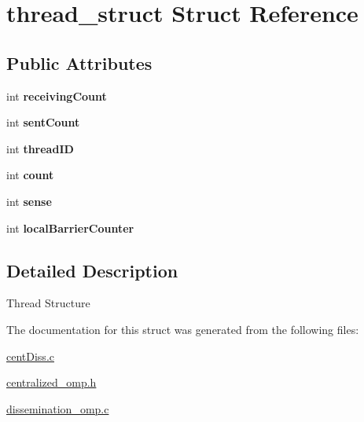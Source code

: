 \hypertarget{structthread__struct}{\section{thread\-\_\-struct \-Struct \-Reference}
\label{structthread__struct}
}
\subsection*{\-Public \-Attributes}
\begin{DoxyCompactItemize}
\item 
\hypertarget{structthread__struct_a4bb7beddb9c9e22e628bdc8fcc1b3571}{int {\bfseries receiving\-Count}}\label{structthread__struct_a4bb7beddb9c9e22e628bdc8fcc1b3571}

\item 
\hypertarget{structthread__struct_a911cf8c6043c7cd16c147370ffed3652}{int {\bfseries sent\-Count}}\label{structthread__struct_a911cf8c6043c7cd16c147370ffed3652}

\item 
\hypertarget{structthread__struct_a5af9a1ead75993e5fb7fdf6b17c2cb64}{int {\bfseries thread\-I\-D}}\label{structthread__struct_a5af9a1ead75993e5fb7fdf6b17c2cb64}

\item 
\hypertarget{structthread__struct_aca0f6c1506913068152ec399813a8d31}{int {\bfseries count}}\label{structthread__struct_aca0f6c1506913068152ec399813a8d31}

\item 
\hypertarget{structthread__struct_a0494827563c62c8dd1b552f2d97b9056}{int {\bfseries sense}}\label{structthread__struct_a0494827563c62c8dd1b552f2d97b9056}

\item 
\hypertarget{structthread__struct_a8060a13d7677b4d95b2fad7a43c9cf23}{int {\bfseries local\-Barrier\-Counter}}\label{structthread__struct_a8060a13d7677b4d95b2fad7a43c9cf23}

\end{DoxyCompactItemize}


\subsection{\-Detailed \-Description}
\-Thread \-Structure 

\-The documentation for this struct was generated from the following files\-:\begin{DoxyCompactItemize}
\item 
\hyperlink{centDiss_8c}{cent\-Diss.\-c}\item 
\hyperlink{centralized__omp_8h}{centralized\-\_\-omp.\-h}\item 
\hyperlink{dissemination__omp_8c}{dissemination\-\_\-omp.\-c}\end{DoxyCompactItemize}

